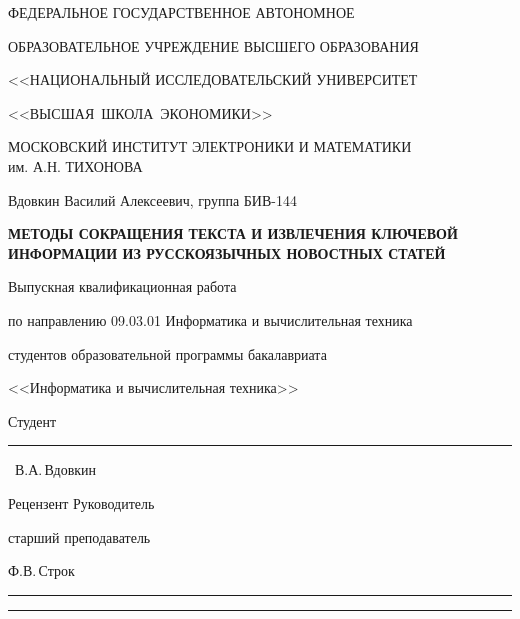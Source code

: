 
\begin{titlepage}
	\begin{center}
		ФЕДЕРАЛЬНОЕ ГОСУДАРСТВЕННОЕ АВТОНОМНОЕ
		
		ОБРАЗОВАТЕЛЬНОЕ УЧРЕЖДЕНИЕ ВЫСШЕГО ОБРАЗОВАНИЯ
		
		<<НАЦИОНАЛЬНЫЙ ИССЛЕДОВАТЕЛЬСКИЙ УНИВЕРСИТЕТ
		
		<<ВЫСШАЯ~ШКОЛА~ЭКОНОМИКИ>>
		\vspace{1cm}
		
		МОСКОВСКИЙ ИНСТИТУТ ЭЛЕКТРОНИКИ И МАТЕМАТИКИ\\  
		им. А.Н. ТИХОНОВА
		\vspace{1cm}
		
		Вдовкин Василий Алексеевич, группа БИВ-144
		
		\vspace{1cm}
		
		\MakeUppercase{\textbf{Методы сокращения текста и извлечения ключевой информации из русскоязычных новостных статей}}
		
		\vspace{1cm}
		
		Выпускная квалификационная работа 
		
		по направлению 09.03.01 Информатика и вычислительная техника 
		
		студентов образовательной программы бакалавриата
		
		<<Информатика и вычислительная техника>>
		
	\end{center}
  	\vspace{1cm}
  	\begin{flushright}
  		Студент~\rule{4cm}{.1pt}~В.А.\,Вдовкин
  	\end{flushright}
  	\vspace{1cm}
  	\begin{flushleft}
  		Рецензент \hfill  Руководитель
  		
  		 \hfill старший преподаватель
  		
  		 \hfill Ф.В.\,Строк
  		
  		\rule{4cm}{.1pt} \hfill \rule{4cm}{.1pt}
  		
  	\end{flushleft}
  	\vfill{}
\end{titlepage}
